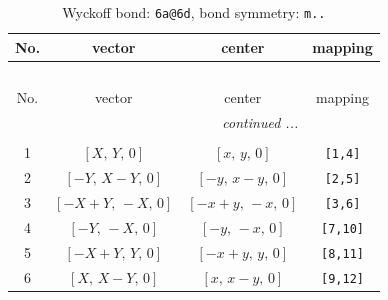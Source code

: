 \documentclass[fleqn,8pt]{jsarticle}
\begin{document}
\begin{longtable}{cccc}
\caption{Wyckoff bond: {\tt 6a@6d}, bond symmetry: {\tt m..}}
 \\
 \hline \hline
No. & vector & center & mapping \\ \hline \endfirsthead

\multicolumn{3}{l}{\tablename\ \thetable{}} \\
 \hline \hline
No. & vector & center & mapping \\ \hline \endhead

 \hline \hline
\multicolumn{3}{r}{\footnotesize\it continued ...} \\ \endfoot

 \hline \hline
\multicolumn{3}{r}{} \\ \endlastfoot

1 & $\left[ X,\, Y,\, 0 \right]$ & $\left[ x,\, y,\, 0 \right]$ & {\tt [1,4]} \\ \hline
2 & $\left[ - Y,\, X - Y,\, 0 \right]$ & $\left[ - y,\, x - y,\, 0 \right]$ & {\tt [2,5]} \\ \hline
3 & $\left[ - X + Y,\, - X,\, 0 \right]$ & $\left[ - x + y,\, - x,\, 0 \right]$ & {\tt [3,6]} \\ \hline
4 & $\left[ - Y,\, - X,\, 0 \right]$ & $\left[ - y,\, - x,\, 0 \right]$ & {\tt [7,10]} \\ \hline
5 & $\left[ - X + Y,\, Y,\, 0 \right]$ & $\left[ - x + y,\, y,\, 0 \right]$ & {\tt [8,11]} \\ \hline
6 & $\left[ X,\, X - Y,\, 0 \right]$ & $\left[ x,\, x - y,\, 0 \right]$ & {\tt [9,12]} \\
\end{longtable}
\renewcommand{\arraystretch}{1.2}
\end{document}
